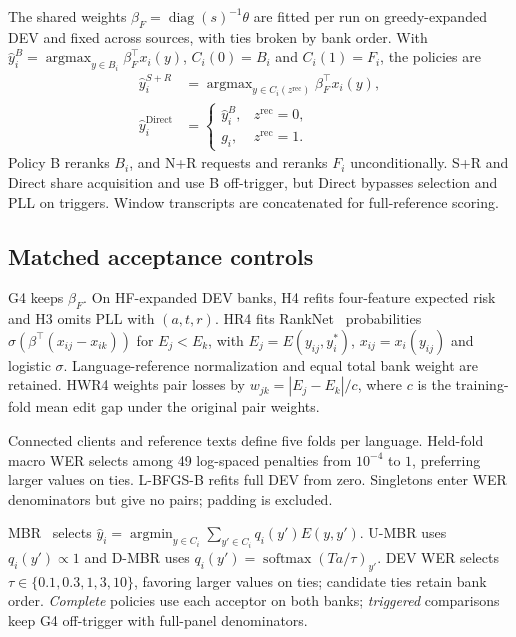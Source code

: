 \documentclass[conference,letterpaper]{IEEEtran}
\DeclareMathOperator*{\argmax}{argmax}
\DeclareMathOperator*{\argmin}{argmin}
\begin{document}
The shared weights $\beta_F=\operatorname{diag}(s)^{-1}\theta$ are fitted per run on greedy-expanded DEV and fixed across sources, with ties broken by bank order. With $\hat{y}_i^B=\argmax_{y\in B_i}\beta_F^\top x_i(y)$, $C_i(0)=B_i$ and $C_i(1)=F_i$, the policies are
\begin{equation}
\begin{aligned}
\hat{y}_i^{S+R}&=\argmax_{y\in C_i(z^{\mathrm{rec}})}\beta_F^\top x_i(y),\\
\hat{y}_i^{\mathrm{Direct}}&=\begin{cases}\hat{y}_i^B,&z^{\mathrm{rec}}=0,\\g_i,&z^{\mathrm{rec}}=1.\end{cases}
\end{aligned}\label{eq:accept}
\end{equation}
Policy B reranks $B_i$, and N+R requests and reranks $F_i$ unconditionally. S+R and Direct share acquisition and use B off-trigger, but Direct bypasses selection and PLL on triggers. Window transcripts are concatenated for full-reference scoring.

\subsection{Matched acceptance controls}
G4 keeps $\beta_F$. On HF-expanded DEV banks, H4 refits four-feature expected risk and H3 omits PLL with $(a,t,r)$. HR4 fits RankNet~\cite{ranknet2005} probabilities $\sigma(\beta^\top(x_{ij} - x_{ik}))$ for $E_j < E_k$, with $E_j = E(y_{ij}, y_i^*)$, $x_{ij} = x_i(y_{ij})$ and logistic $\sigma$. Language-reference normalization and equal total bank weight are retained. HWR4 weights pair losses by $w_{jk} = |E_j - E_k|/c$, where $c$ is the training-fold mean edit gap under the original pair weights.

Connected clients and reference texts define five folds per language. Held-fold macro WER selects among 49 log-spaced penalties from $10^{-4}$ to $1$, preferring larger values on ties. L-BFGS-B refits full DEV from zero. Singletons enter WER denominators but give no pairs; padding is excluded.

MBR~\cite{goel2000mbr} selects $\hat y_i=\allowbreak\argmin_{y\in C_i}\sum_{y'\in C_i}q_i(y')E(y,y')$. U-MBR uses $q_i(y')\propto1$ and D-MBR uses $q_i(y')=\operatorname{softmax}(Ta/\tau)_{y'}$. DEV WER selects $\tau\in\{0.1,0.3,1,3,10\}$, favoring larger values on ties; candidate ties retain bank order. \emph{Complete} policies use each acceptor on both banks; \emph{triggered} comparisons keep G4 off-trigger with full-panel denominators.
\end{document}

